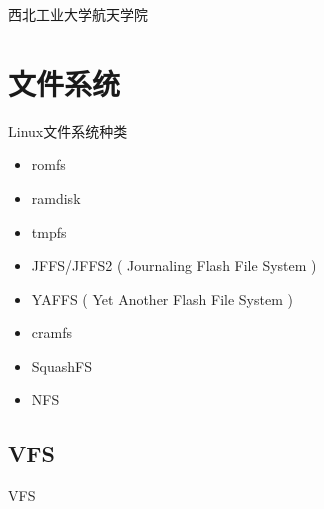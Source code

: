 

\def\lecturename{嵌入式技术}

\title{\insertlecture}

\author{邢超}

\institute
{
  西北工业大学航天学院
}


\subtitle{GNU/Linux文件系统}
\date{2015}



\begin{frame}
  \maketitle
\end{frame}

\section{文件系统}
\begin{frame}{Linux文件系统种类}
\begin{itemize}
\item  romfs
\item  ramdisk
\item  tmpfs
\item  JFFS/JFFS2 ( Journaling Flash File System )
\item  YAFFS ( Yet Another Flash File System )
\item  cramfs
\item  SquashFS
\item  NFS
\end{itemize}
\end{frame}

\subsection{VFS}
\begin{frame}{VFS}
\begin{center}\end{center}
\end{frame}

